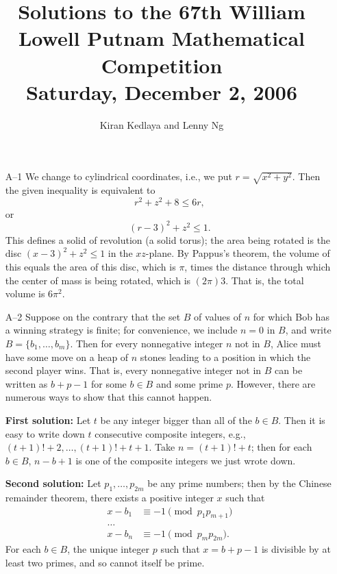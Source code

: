 \documentclass[amssymb,twocolumn,pra,10pt,aps]{revtex4-1}
\begin{document}
\title{Solutions to the 67th William Lowell Putnam Mathematical Competition \\
    Saturday, December 2, 2006}
\author{Kiran Kedlaya and Lenny Ng}
\noaffiliation
\maketitle

\begin{itemize}

\item[A--1]
We change to cylindrical coordinates, i.e., we put $r = \sqrt{x^2 + y^2}$.
Then the given inequality is equivalent to
\[
r^2 + z^2 + 8 \leq 6r,
\]
or
\[
(r-3)^2 + z^2 \leq 1.
\]
This defines a solid of revolution (a solid torus); the area being rotated
is the disc $(x-3)^2 + z^2 \leq 1$ in the $xz$-plane. By Pappus's theorem,
the volume of this equals the area of this disc, which is $\pi$, times the
distance through which the center of mass is being rotated, which is $(2\pi)3$.
That is, the total volume is $6 \pi^2$.

\item[A--2]
Suppose on the contrary that the set $B$ of values of $n$ for which Bob
has a winning strategy is finite; for convenience, we include $n=0$ in $B$,
and write $B = \{b_1, \dots, b_m\}$.
Then for every nonnegative integer $n$ not
in $B$, Alice must have some move on a heap of $n$ stones leading to a
position in which the second player wins. That is, every nonnegative integer
not in $B$ can be written as $b + p - 1$ for some $b \in B$ and some prime
$p$. However, there are numerous ways to show that this cannot happen.

\textbf{First solution:}
Let $t$ be any integer bigger than all of the $b \in B$. Then it is easy to
write down $t$ consecutive composite integers, e.g., $(t+1)! + 2, \dots,
(t+1)! + t+1$. Take $n = (t+1)! + t$; then for each $b \in B$,
$n - b + 1$ is one of the composite integers we just wrote down.

\textbf{Second solution:}
Let $p_1, \dots, p_{2m}$ be
any prime numbers; then by the Chinese remainder theorem, there exists a
positive integer $x$ such that
\begin{align*}
x - b_1 &\equiv -1 \pmod{p_1 p_{m+1}} \\
\dots \\
x - b_n &\equiv -1 \pmod{p_m p_{2m}}.
\end{align*}
For each $b \in B$,
the unique integer $p$ such that $x=b+p-1$ is divisible
by at least two primes, and so cannot itself be prime.


\end{itemize}
\end{document}

